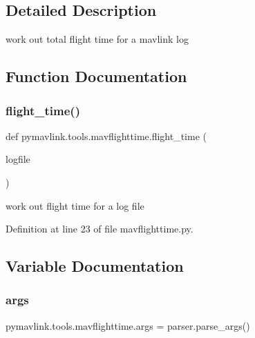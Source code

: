 \subsection{Detailed Description}
\begin{DoxyVerb}work out total flight time for a mavlink log
\end{DoxyVerb}
 

\subsection{Function Documentation}
\mbox{\label{namespacepymavlink_1_1tools_1_1mavflighttime_a20110edf75eca397a2929bc07ce011ca}} 
\subsubsection{\texorpdfstring{flight\_time()}{flight\_time()}}
{\footnotesize\ttfamily def pymavlink.\+tools.\+mavflighttime.\+flight\+\_\+time (\begin{DoxyParamCaption}\item[{}]{logfile }\end{DoxyParamCaption})}

\begin{DoxyVerb}work out flight time for a log file\end{DoxyVerb}
 

Definition at line 23 of file mavflighttime.\+py.



\subsection{Variable Documentation}
\mbox{\label{namespacepymavlink_1_1tools_1_1mavflighttime_a204d9242d26e222235baa22da7808820}} 
\subsubsection{\texorpdfstring{args}{args}}
{\footnotesize\ttfamily pymavlink.\+tools.\+mavflighttime.\+args = parser.\+parse\+\_\+args()}



